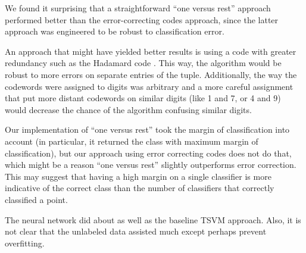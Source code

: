 \documentclass[11pt]{article}
\begin{document}
We found it surprising that a straightforward ``one versus rest''
approach performed better than the error-correcting codes approach,
since the latter approach was engineered to be robust to classification
error.

An approach that might have yielded better results is
using a code with greater redundancy such as the Hadamard
code \cite{macwilliams1977theory}.
This way, the algorithm would be robust to more errors on separate entries
of the tuple.
Additionally, the way the codewords were assigned to digits was arbitrary
and a more careful assignment that put more distant codewords on
similar digits (like 1 and 7, or 4 and 9) would decrease the chance
of the algorithm confusing similar digits.

Our implementation of ``one versus rest'' took the margin of classification
into account (in particular, it returned the class with maximum margin of
classification), but our approach using error correcting codes does not do that,
which might be a reason ``one versus rest'' slightly 
outperforms error correction. This may suggest that having a high margin
on a single classifier is more indicative of the correct class than
the number of classifiers that correctly classified a point.

The neural network did about as well as the baseline TSVM approach. Also, it is not clear that the unlabeled data assisted much except perhaps prevent overfitting.
\end{document}
